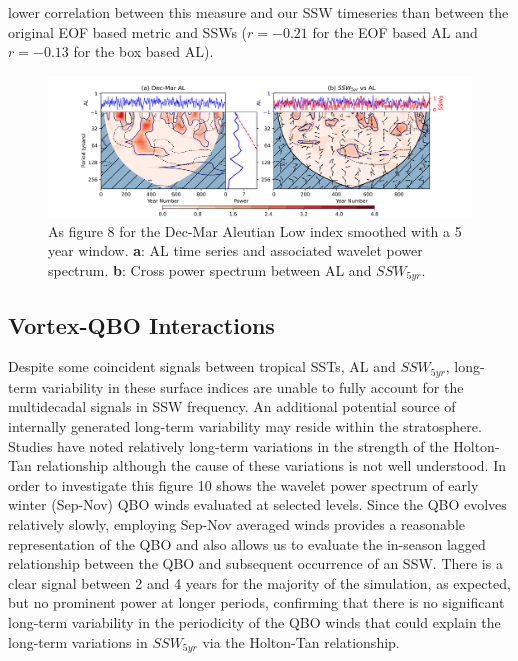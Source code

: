 lower correlation between this measure and our SSW timeseries than between the original EOF based metric and SSWs ($r = -0.21$ for the EOF based AL and $r = -0.13$ for the box based AL).


\begin{center}
\begin{figure}[h!]
\includegraphics[width = \linewidth]{Figures/Figures-origins/AL_wavelet_combined.png}
\caption{As figure 8 for the Dec-Mar Aleutian Low index smoothed with a 5 year window. \textbf{a}: AL time series and associated wavelet power spectrum. \textbf{b}: Cross power spectrum between AL and $SSW_{5yr}$.}
\end{figure}
\end{center}


\subsection{Vortex-QBO Interactions}
Despite some coincident signals between tropical SSTs, AL and $SSW_{5yr}$, long-term variability in these surface indices are unable to fully account for the  multidecadal signals in SSW frequency. An additional potential source of internally generated long-term variability may reside within the stratosphere. Studies have noted relatively long-term variations in the strength of the Holton-Tan relationship \citep{Lu2008, Lu14, OspEA10} although the cause of these variations is not well understood. In order to investigate this figure 10 shows the wavelet power spectrum of early winter (Sep-Nov) QBO winds evaluated at selected levels. Since the QBO evolves relatively slowly, employing Sep-Nov averaged winds provides a reasonable representation of the QBO and also allows us to evaluate the in-season lagged relationship between the QBO and subsequent occurrence of an SSW. There is a clear signal between 2 and 4 years for the majority of the simulation, as expected, but no prominent power at longer periods,  confirming that there is no significant long-term variability in the periodicity of the QBO winds that could explain the long-term variations in $SSW_{5yr}$ via the Holton-Tan relationship.

